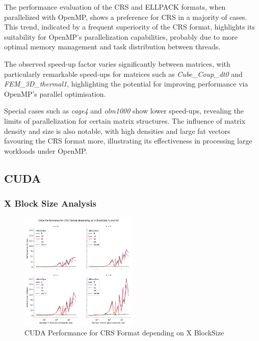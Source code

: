 \documentclass[12pt,oneside]{book} %
\begin{document}
\newpage
The performance evaluation of the CRS and ELLPACK formats, when parallelized
with OpenMP, shows a preference for CRS in a majority of cases. This trend,
indicated by a frequent superiority of the CRS format, highlights its
suitability for OpenMP's parallelization capabilities, probably due to more
optimal memory management and task distribution between threads.

The observed speed-up factor varies significantly between matrices, with
particularly remarkable speed-ups for matrices such as \textit{Cube\_Coup\_dt0}
and \textit{FEM\_3D\_thermal1}, highlighting the potential for improving
performance via OpenMP's parallel optimisation.

Special cases such as \textit{cage4} and \textit{olm1000} show lower speed-ups,
revealing the limits of parallelization for certain matrix structures. The
influence of matrix density and size is also notable, with high densities and
large fat vectors favouring the CRS format more, illustrating its effectiveness
in processing large workloads under OpenMP.

\newpage
\subsection{CUDA}

\subsubsection{X Block Size Analysis}

\begin{figure}[H]
    \centering
    \includegraphics[width=0.5\textwidth]{../results/images/CUDA_xBlockSize_CRS.png}
    \caption{CUDA Performance for CRS Format depending on X BlockSize}
    \label{fig:cudaxblocksizecrs}
\end{figure}
\end{document}
